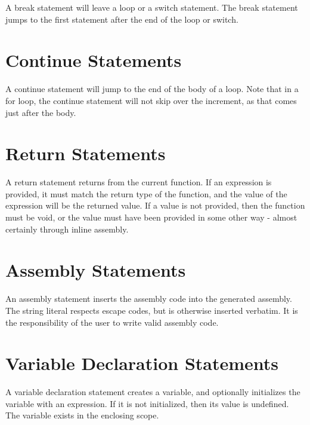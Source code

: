 \documentclass[letterpaper,12pt]{book}
\begin{document}
A break statement will leave a loop or a switch statement. The break statement jumps to the first statement after the end of the loop or switch.

\section{Continue Statements}



A continue statement will jump to the end of the body of a loop. Note that in a for loop, the continue statement will not skip over the increment, as that comes just after the body.

\section{Return Statements}



A return statement returns from the current function. If an expression is provided, it must match the return type of the function, and the value of the expression will be the returned value. If a value is not provided, then the function must be void, or the value must have been provided in some other way - almost certainly through inline assembly.

\section{Assembly Statements}



An assembly statement inserts the assembly code into the generated assembly. The string literal respects escape codes, but is otherwise inserted verbatim. It is the responsibility of the user to write valid assembly code.

\section{Variable Declaration Statements}



A variable declaration statement creates a variable, and optionally initializes the variable with an expression. If it is not initialized, then its value is undefined. The variable exists in the enclosing scope.
\end{document}
